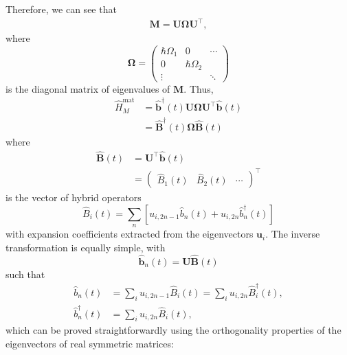 \documentclass{article}
\begin{document}
Therefore, we can see that
\begin{equation}
\begin{split}
\mathbf{M} = \mathbf{U}\bm{\Omega}\mathbf{U}^\top,
\end{split}
\end{equation}
where
\begin{equation}
\bm{\Omega} = 
\begin{pmatrix}
\hbar\Omega_1 & 0 & \cdots\\
0 & \hbar\Omega_2 &\\
\vdots & & \ddots
\end{pmatrix}
\end{equation}
is the diagonal matrix of eigenvalues of $\mathbf{M}$. Thus, 
\begin{equation}
\begin{split}
\hat{H}_M^\mathrm{mat} &= \hat{\mathbf{b}}^\dagger(t)\mathbf{U}\bm{\Omega}\mathbf{U}^\top\hat{\mathbf{b}}(t)\\
&= \hat{\mathbf{B}}^\dagger(t)\bm{\Omega}\hat{\mathbf{B}}(t)
\end{split}
\end{equation}
where
\begin{equation}
\begin{split}
\hat{\mathbf{B}}(t) &= \mathbf{U}^\top\hat{\mathbf{b}}(t)\\
&= 
\begin{pmatrix}
\hat{B}_1(t) & \hat{B}_2(t) & \cdots
\end{pmatrix}^\top
\end{split}
\end{equation}
is the vector of hybrid operators
\begin{equation}
\hat{B}_i(t) = \sum_n\left[u_{i,2n-1}\hat{b}_n(t) + u_{i,2n}\hat{b}_n^\dagger(t)\right]
\end{equation}
with expansion coefficients extracted from the eigenvectors $\mathbf{u}_i$. The inverse transformation is equally simple, with
\begin{equation}
\hat{\mathbf{b}}_n(t) = \mathbf{U}\hat{\mathbf{B}}(t)
\end{equation}
such that
\begin{equation}
\begin{split}
\hat{b}_n(t) &= \sum_iu_{i,2n - 1}\hat{B}_i(t) = \sum_iu_{i,2n}\hat{B}_i^\dagger(t),\\
\hat{b}_n^\dagger(t) &= \sum_iu_{i,2n}\hat{B}_i(t),
\end{split}
\end{equation}
which can be proved straightforwardly using the orthogonality properties of the eigenvectors of real symmetric matrices:
\end{document}
